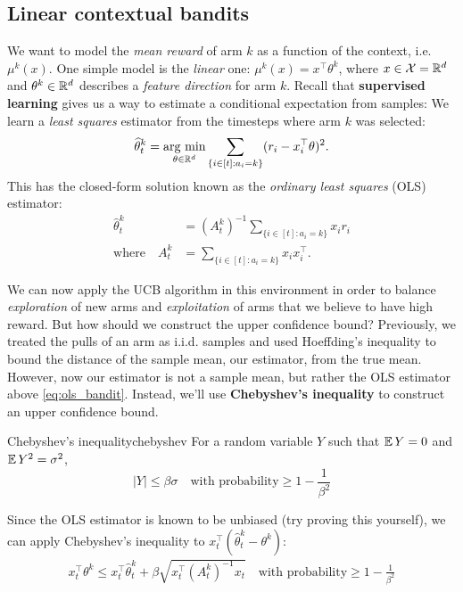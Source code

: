 \documentclass[\main/main]{subfiles}
\begin{document}
\subsection{Linear contextual bandits}

We want to model the \emph{mean reward} of arm $k$ as a function of the context, i.e. $\mu^k(x)$.
One simple model is the \emph{linear} one: $\mu^k(x) = x^\top \theta^k$, where $x \in \mathcal{X} = \mathbb{R}^d$ and $\theta^k \in \mathbb{R}^d$ describes a \emph{feature direction} for arm $k$.
Recall that \textbf{supervised learning} gives us a way to estimate a conditional expectation from samples:
We learn a \emph{least squares} estimator from the timesteps where arm $k$ was selected:
\[
    \widehat \theta_t^k = \operatorname*{\textrm{arg\ min}}_{\theta \in \mathbb{R}^d} \sum_{\{ i \in [t] : a_i = k \}} (r_i - x_i^\top \theta)^2.
\]
This has the closed-form solution known as the \emph{ordinary least squares} (OLS) estimator:
\begin{equation}
    \begin{aligned}
        \hat \theta_t^k          & = (A_t^k)^{-1} \sum_{\{ i \in [t] : a_i = k \}} x_i r_i \\
        \text{where} \quad A_t^k & = \sum_{\{ i \in [t] : a_i = k \}} x_i x_i^\top.
    \end{aligned}
    \label{eq:ols_bandit}
\end{equation}

We can now apply the UCB algorithm in this environment in order to balance \emph{exploration} of new arms and \emph{exploitation} of arms that we believe to have high reward.
But how should we construct the upper confidence bound?
Previously, we treated the pulls of an arm as i.i.d. samples and used Hoeffding's inequality to bound the distance of the sample mean, our estimator, from the true mean.
However, now our estimator is not a sample mean, but rather the OLS estimator above \eqref{eq:ols_bandit}.
Instead, we'll use \textbf{Chebyshev's inequality} to construct an upper confidence bound.

\begin{theorem}{Chebyshev's inequality}{chebyshev}
    For a random variable $Y$ such that $\operatorname*{\mathbb{E}} Y = 0$ and $\operatorname*{\mathbb{E}} Y^2 = \sigma^2$,
    \[
        |Y| \le \beta \sigma \quad \text{with probability} \ge 1 - \frac{1}{\beta^2}
    \]
\end{theorem}

Since the OLS estimator is known to be unbiased (try proving this yourself), we can apply Chebyshev's inequality to $x_t^\top (\hat \theta_t^k - \theta^k)$:
\begin{align*}
    x_t^\top \theta^k \le x_t^\top \hat \theta_t^k + \beta \sqrt{x_t^\top (A_t^k)^{-1} x_t} \quad \text{with probability} \ge 1 - \frac{1}{\beta^2}
\end{align*}
\end{document}
